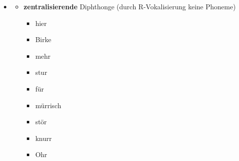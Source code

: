 \begin{frame}

\begin{itemize}
	\item[]
		
	\begin{itemize}
		\item \textbf{zentralisierende} Diphthonge (durch R-Vokalisierung \ras keine Phoneme)

		\ea 
		\begin{itemize}
			\item {} \ras hier
			\item {} \ras Birke
			\item {} \ras mehr
			\item {} \ras stur
			\item {} \ras für
			\item {} \ras mürrisch
			\item {} \ras stör
			\item {} \ras knurr
			\item {} \ras Ohr
		\end{itemize}
		\z
		
	\end{itemize}

						 		
\end{itemize}
	
\end{frame}



